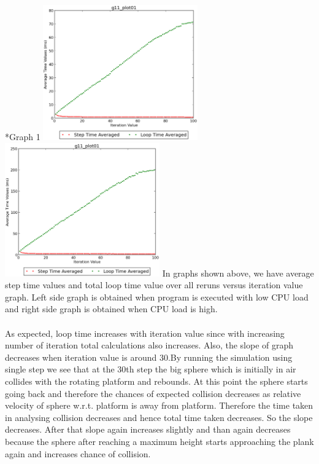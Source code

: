 \documentclass[11pt]{article}
\begin{document}
\begin{subsection}*{Graph 1}
\includegraphics[width=0.5\textwidth,keepaspectratio]{1.eps} \includegraphics[width=0.5\textwidth,keepaspectratio]{load_1.eps}
In graphs shown above, we have average step time values and total loop time value over all reruns versus iteration value graph. Left side graph is obtained when program is executed with low CPU load and right side graph is obtained when CPU load is high.
\\\\ 
As expected, loop time increases with iteration value since with increasing number of iteration total calculations also increases. Also, the slope of graph decreases when iteration value is around 30.By running the simulation using single step we see that at the 30th step the big sphere which is initially in air collides with the rotating platform and rebounds. At this point the sphere starts going back and therefore the chances of expected collision decreases as relative velocity of sphere w.r.t. platform is away from platform. Therefore the time taken in analysing collision decreases and hence total time taken decreases. So the slope decreases. After that slope again increases slightly and than again decreases because the sphere after reaching a maximum height starts approaching the plank again and increases chance of collision.
\\\\

\end{subsection}
\end{document}
